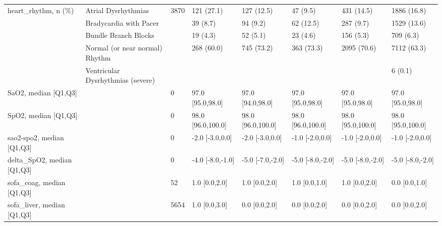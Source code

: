 \begin{tabular}{llllllll}
heart\_rhythm, n (\%) & Atrial Dysrhythmias &            3870 &                121 (27.1) &                127 (12.5) &                 47 (9.5) &                431 (14.5) &              1886 (16.8) \\
                        & Bradycardia with Pacer &                 &                  39 (8.7) &                  94 (9.2) &                62 (12.5) &                 287 (9.7) &              1529 (13.6) \\
                        & Bundle Branch Blocks &                 &                  19 (4.3) &                  52 (5.1) &                 23 (4.6) &                 156 (5.3) &                709 (6.3) \\
                        & Normal (or near normal) Rhythm &                 &                268 (60.0) &                745 (73.2) &               363 (73.3) &               2095 (70.6) &              7112 (63.3) \\
                        & Ventricular Dysrhythmias (severe) &                 &                           &                           &                          &                           &                  6 (0.1) \\
SaO2, median [Q1,Q3] &                                   &               0 &          97.0 [95.0,98.0] &          97.0 [94.0,98.0] &         97.0 [95.0,98.0] &          97.0 [95.0,98.0] &         97.0 [95.0,98.0] \\
SpO2, median [Q1,Q3] &                                   &               0 &         98.0 [96.0,100.0] &         98.0 [96.0,100.0] &        98.0 [96.0,100.0] &         98.0 [95.0,100.0] &        98.0 [95.0,100.0] \\
sao2-spo2, median [Q1,Q3] &                                   &               0 &           -2.0 [-3.0,0.0] &           -2.0 [-3.0,0.0] &          -1.0 [-2.0,0.0] &           -1.0 [-2.0,0.0] &          -1.0 [-2.0,0.0] \\
delta\_SpO2, median [Q1,Q3] &                                   &               0 &          -4.0 [-8.0,-1.0] &          -5.0 [-7.0,-2.0] &         -5.0 [-8.0,-2.0] &          -5.0 [-8.0,-2.0] &         -5.0 [-8.0,-2.0] \\
sofa\_coag, median [Q1,Q3] &                                   &              52 &             1.0 [0.0,2.0] &             1.0 [0.0,2.0] &            1.0 [0.0,1.0] &             1.0 [0.0,2.0] &            0.0 [0.0,1.0] \\
sofa\_liver, median [Q1,Q3] &                                   &            5654 &             1.0 [0.0,3.0] &             0.0 [0.0,2.0] &            0.0 [0.0,2.0] &             0.0 [0.0,2.0] &            0.0 [0.0,2.0] \\

\end{tabular}
